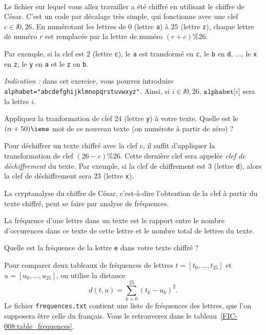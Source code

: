 \exer{[FIC-008]}
\setcounter{numques}{0}~\\


Le fichier sur lequel vous allez travailler a été chiffré en utilisant le chiffre de César. C'est un code par décalage très simple, qui fonctionne avec une clef $c \in \ii{0,26}$. 
En numérotant les lettres de $0$ (lettre \texttt a) à $25$ (lettre \texttt z), chaque lettre de numéro $r$ est remplacée par la lettre de numéro $(r+c) \% 26$. 

Par exemple, si la clef est $2$ (lettre \texttt c), le \texttt a est transformé en \texttt c, le \texttt b en \texttt d, ..., le \texttt x en \texttt z, le \texttt y en \texttt a et le \texttt z en \texttt b.

\medskip{}

\emph{Indication :} dans cet exercice, vous pourrez introduire \texttt{alphabet="abcdefghijklmnopqrstuvwxyz"}. Ainsi, si $i\in \ii{0,26}$, $\texttt{alphabet[}i\texttt{]}$ sera la lettre \no$i$.

\medskip{}

\question{} Appliquez la tranformation de clef 24 (lettre \texttt y) à votre texte. Quelle est le $(\alpha+50)\ieme$ mot de ce nouveau texte (on numérote à partir de zéro) ?

\medskip{}

Pour déchiffrer un texte chiffré avec la clef $c$, il suffit d'appliquer la transformation de clef $(26 - c) \% 26$. Cette dernière clef sera appelée \emph{clef de déchiffrement} du texte.
Par exemple, si la clef de chiffrement est $3$ (lettre \texttt d), alors la clef de déchiffrement sera $23$ (lettre \texttt x).

La cryptanalyse du chiffre de César, c'est-à-dire l'obtention de la clef à partir du texte chiffré, peut se faire par analyse de fréquences. 

La fréquence d'une lettre dans un texte est le rapport entre le nombre d'occurences dans ce texte de cette lettre et le nombre total de lettres du texte. 

\medskip{}

\question{} Quelle est la fréquence de la lettre \texttt{e} dans votre texte chiffré ? 

\medskip{}

Pour comparer deux tableaux de fréquences de lettres $t = [t_0,\dots,t_ {25}]$ et $u = [u_0,\dots,u_{25}]$, on utilise la distance 
\begin{equation*}
    d(t,u) = \sum_{k=0}^{25} (t_k-u_k)^2.
\end{equation*}
Le fichier \texttt{frequences.txt} contient une liste de fréquences des lettres, que l'on supposera être celle du français. Vous le retrouverez dans le tableau~\ref{FIC-008:table_frequences}. 

